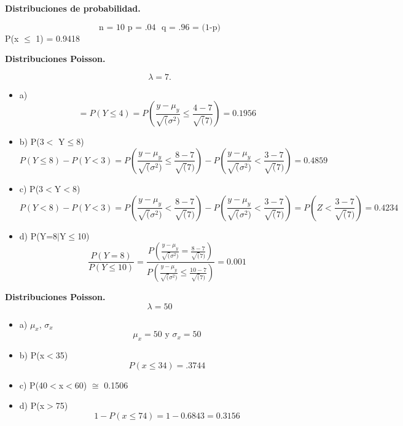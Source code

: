 \documentclass{../oxmathproblems}
\begin{document}
\begin{questions}

\miquestion\textbf {Distribuciones de probabilidad.}

$$ \text {n = 10 } 
\text {p = .04 }
\text { q = .96 = (1-p)} 
$$
P(x $\leq$ 1) = 0.9418

\miquestion\textbf{Distribuciones Poisson.}

$$ \lambda = 7. $$
 
 \begin{itemize}
\item  a) 
$$ 
 = P( Y \leq 4) = P( \frac{y- \mu_y}{\sqrt(\sigma^2)} \leq \frac{4-7}{\sqrt(7)}) 
 = 0.1956   %
$$
\item  b) P(3$<$ Y$\leq$8)
$$ P(Y \leq 8) - P(Y < 3)
=  P( \frac{y- \mu_y}{\sqrt(\sigma^2)} \leq \frac{8-7}{\sqrt(7)}) -  P( \frac{y- \mu_y}{\sqrt(\sigma^2)} < \frac{3-7}{\sqrt(7)}) = 0.4859  %
$$

\item  c) P(3$<$Y$<$8)
$$ P(Y < 8) - P(Y < 3)
=  P( \frac{y- \mu_y}{\sqrt(\sigma^2)} < \frac{8-7}{\sqrt(7)}) -  P( \frac{y- \mu_y}{\sqrt(\sigma^2)} < \frac{3-7}{\sqrt(7)}) =   P (Z < \frac{3-7}{\sqrt(7)}) = 0.4234  %
$$ 
\item  d) P(Y=8$\mid$Y$\leq$10)
$$ \frac{P( Y=8)}{P( Y \leq 10)} =  \frac{P(\frac{y- \mu_y}{\sqrt(\sigma^2)} =  \frac{8-7}{\sqrt(7)})}{P( \frac{y- \mu_y}{\sqrt(\sigma^2)} \leq \frac{10-7}{\sqrt(7)})} = 0.001 %
$$
\end{itemize}

\miquestion\textbf{Distribuciones Poisson. }
$$ \lambda = 50 $$  
\begin{itemize}
\item a) $\mu_x$, $\sigma_x$
$$ \mu_x = 50 \text{ y } \sigma_x = 50 $$
\item  b) P(x$<$35)
$$ P(x \leq 34) = .3744 $$ %
\item  c) P(40$<$x$<$60) $\cong$ 0.1506 %

\item  d) P(x$>$75)
$$ 1- P( x \leq 74) = 1 - 0.6843  = 0.3156  $$  %
\end{itemize}


\end{questions}
\end{document}
